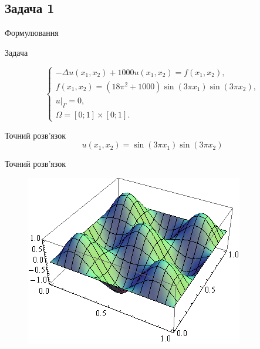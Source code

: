 
\subsection{Задача 1}
\frame{\subsectionpage}
\begin{frame}{Формулювання}

		Задача

		\begin{equation}\label{eq:problem1}
		\begin{cases}
			- \Delta u(x_1,x_2) + 1000u(x_1, x_2) = f(x_1,x_2), \\
			f(x_1,x_2) = (18 \pi^2 +1000)\sin(3 \pi x_1) \sin (3 \pi x_2), \\
			u|_\Gamma = 0 ,\\
			\Omega = \left[0;1\right] \times \left[0;1\right].
		\end{cases}
		\end{equation}

		Точний розв'язок
		\begin{equation}
			u(x_1,x_2) = \sin(3 \pi x_1) \sin (3 \pi x_2)
		\end{equation}

\end{frame}

\begin{frame}{Точний розв'язок}
		\begin{figure}[H]
			\centering
		    \includegraphics[scale=0.6]{problem1/ExactSolution}
		    \label{plot:problem1_exact}
		\end{figure}
\end{frame}

